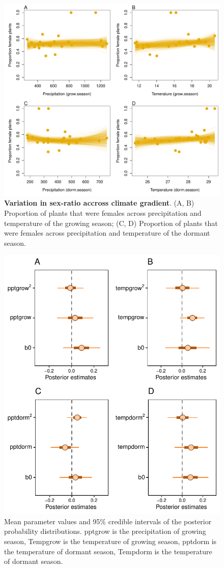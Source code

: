 \documentclass[12pt]{article}\usepackage[]{graphicx}\usepackage[dvipsnames]{xcolor}
\begin{document}
\begin{figure}[H]
  \begin{center}
    \includegraphics[width=0.95\linewidth]{Figures/gardens_SR.pdf}
  \caption{\textbf{Variation in sex-ratio accross climate gradient}.
  (A, B) Proportion of plants that were females across precipitation and temperature of the growing season; (C, D) Proportion of plants that were females across precipitation and temperature of the dormant season.}
  \label{Sup:gardens_SR}
  \end{center}
\end{figure}

\begin{figure}[H]
		\centering
		\includegraphics[width=0.75\linewidth]{Figures/Posterior_SR.pdf}
		\caption{Mean parameter values and 95\% credible intervals of the posterior probability distributions. 
		pptgrow is  the precipitation of growing season,
		Tempgrow is the temperature of growing season,
		pptdorm is the temperature of dormant season,
		Tempdorm is the temperature of dormant season.}
		\label{Sup:PosteriorSR}
\end{figure}
	
\end{document}
